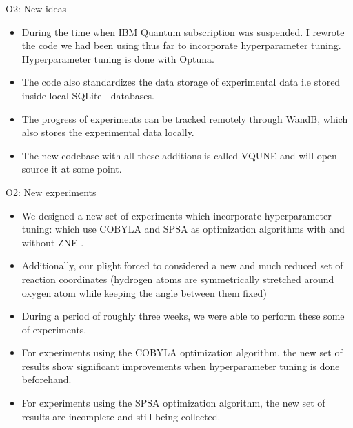 \begin{frame}{O2: New ideas}
  \begin{itemize}
    \setlength\itemsep{0.1em}
    \item During the time when IBM Quantum subscription was suspended. I rewrote the code we had been using thus far
          to incorporate hyperparameter tuning. Hyperparameter tuning is done with {\color{blue}Optuna}.

    \item The code also standardizes the data storage of experimental data i.e stored inside local {\color{blue}SQLite} 
          databases.

    \item The progress of experiments can be tracked remotely through {\color{blue}WandB},
          which also stores the experimental data locally.

    \item The new codebase with all these additions is called {\color{red}VQUNE} and will open-source it at some point.
  \end{itemize}
\end{frame}

\begin{frame}{O2: New experiments}
  \begin{itemize}
    \setlength\itemsep{0.1em}

    \item We designed a new set of experiments which incorporate hyperparameter tuning: which use COBYLA and SPSA as optimization algorithms with and without ZNE .

    \item Additionally, our plight forced to considered a new and much reduced set of reaction coordinates
          (hydrogen atoms are symmetrically stretched around oxygen atom while keeping the angle between them fixed)

    \item During a period of roughly three weeks, we were able to perform these some of experiments.

    \item For experiments using the COBYLA optimization algorithm, the new set of results show significant improvements when hyperparameter tuning is done beforehand.

    \item For experiments using the SPSA optimization algorithm, the new set of results are incomplete and still being collected.
  \end{itemize}
\end{frame}
